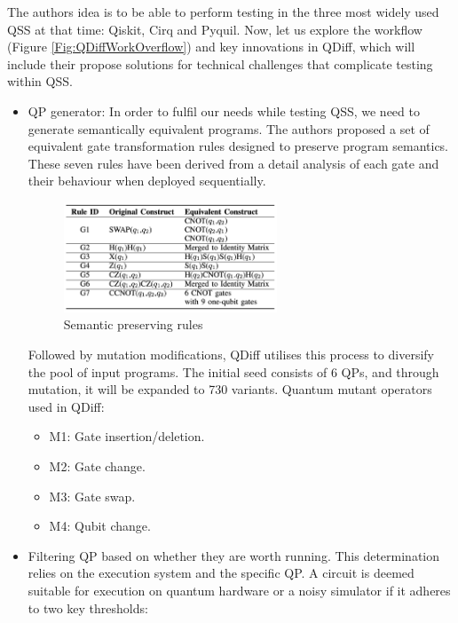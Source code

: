 The authors idea is to be able to perform testing in the three most widely used QSS \cite{larose2019overview} at that time: Qiskit, Cirq and Pyquil. Now, let us explore the workflow (Figure \ref{Fig:QDiffWorkOverflow}) and key innovations in  QDiff, which will include their propose solutions for technical challenges that complicate testing within QSS.

\begin{itemize}
    \item QP generator: In order to fulfil our needs while testing QSS, we need to generate semantically equivalent programs. The authors proposed a set of equivalent gate transformation rules designed to preserve program semantics. These seven rules have been derived from a detail analysis of each gate and their behaviour when deployed sequentially.
    \begin{figure}[H]
        \centering
        \includegraphics[width=0.6\textwidth]{TFM/photos/QDiffRules.png}
        \caption{Semantic preserving rules \cite{wang2021qdiff}} 
        \label{Fig:QDiffRules}
    \end{figure}

    Followed by mutation modifications, QDiff utilises this process to diversify the pool of input programs. The initial seed consists of 6 QPs, and through mutation, it will be expanded to 730 variants. Quantum mutant operators used in QDiff:
        \begin{itemize}
            \item[] M1: Gate insertion/deletion.
            \item[] M2: Gate change.
            \item[] M3: Gate swap.
            \item[] M4: Qubit change.
        \end{itemize}

    \item Filtering QP based on whether they are worth running. This determination relies on the execution system and the specific QP. A circuit is deemed suitable for execution on quantum hardware or a noisy simulator if it adheres to two key thresholds:
    

\end{itemize}
